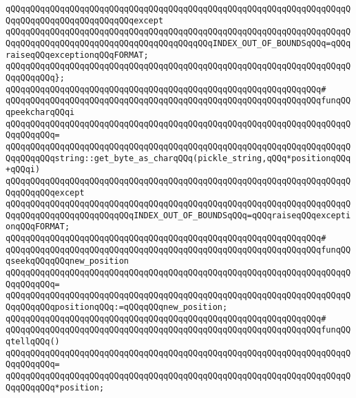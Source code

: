 \verb|qQQqqQQqqQQqqQQqqQQqqQQqqQQqqQQqqQQqqQQqqQQqqQQqqQQqqQQqqQQqqQQqqQQqqQQqqQQqqQQqqQQqqQQqqQQqqQQqexcept|\newline
\verb|qQQqqQQqqQQqqQQqqQQqqQQqqQQqqQQqqQQqqQQqqQQqqQQqqQQqqQQqqQQqqQQqqQQqqQQqqQQqqQQqqQQqqQQqqQQqqQQqqQQqqQQqqQQqqQQqINDEX_OUT_OF_BOUNDSqQQq=qQQqraiseqQQqexceptionqQQqFORMAT;|\newline
\verb|qQQqqQQqqQQqqQQqqQQqqQQqqQQqqQQqqQQqqQQqqQQqqQQqqQQqqQQqqQQqqQQqqQQqqQQqqQQqqQQq};|\newline
\verb|qQQqqQQqqQQqqQQqqQQqqQQqqQQqqQQqqQQqqQQqqQQqqQQqqQQqqQQqqQQqqQQq#|\newline
\verb|qQQqqQQqqQQqqQQqqQQqqQQqqQQqqQQqqQQqqQQqqQQqqQQqqQQqqQQqqQQqqQQqfunqQQqpeekcharqQQqi|\newline
\verb|qQQqqQQqqQQqqQQqqQQqqQQqqQQqqQQqqQQqqQQqqQQqqQQqqQQqqQQqqQQqqQQqqQQqqQQqqQQqqQQq=|\newline
\verb|qQQqqQQqqQQqqQQqqQQqqQQqqQQqqQQqqQQqqQQqqQQqqQQqqQQqqQQqqQQqqQQqqQQqqQQqqQQqqQQqstring::get_byte_as_charqQQq(pickle_string,qQQq*positionqQQq+qQQqi)|\newline
\verb|qQQqqQQqqQQqqQQqqQQqqQQqqQQqqQQqqQQqqQQqqQQqqQQqqQQqqQQqqQQqqQQqqQQqqQQqqQQqqQQqexcept|\newline
\verb|qQQqqQQqqQQqqQQqqQQqqQQqqQQqqQQqqQQqqQQqqQQqqQQqqQQqqQQqqQQqqQQqqQQqqQQqqQQqqQQqqQQqqQQqqQQqqQQqINDEX_OUT_OF_BOUNDSqQQq=qQQqraiseqQQqexceptionqQQqFORMAT;|\newline
\newline
\newline
\verb|qQQqqQQqqQQqqQQqqQQqqQQqqQQqqQQqqQQqqQQqqQQqqQQqqQQqqQQqqQQqqQQq#|\newline
\verb|qQQqqQQqqQQqqQQqqQQqqQQqqQQqqQQqqQQqqQQqqQQqqQQqqQQqqQQqqQQqqQQqfunqQQqseekqQQqqQQqnew_position|\newline
\verb|qQQqqQQqqQQqqQQqqQQqqQQqqQQqqQQqqQQqqQQqqQQqqQQqqQQqqQQqqQQqqQQqqQQqqQQqqQQqqQQq=|\newline
\verb|qQQqqQQqqQQqqQQqqQQqqQQqqQQqqQQqqQQqqQQqqQQqqQQqqQQqqQQqqQQqqQQqqQQqqQQqqQQqqQQqpositionqQQq:=qQQqqQQqnew_position;|\newline
\newline
\verb|qQQqqQQqqQQqqQQqqQQqqQQqqQQqqQQqqQQqqQQqqQQqqQQqqQQqqQQqqQQqqQQq#|\newline
\verb|qQQqqQQqqQQqqQQqqQQqqQQqqQQqqQQqqQQqqQQqqQQqqQQqqQQqqQQqqQQqqQQqfunqQQqtellqQQq()|\newline
\verb|qQQqqQQqqQQqqQQqqQQqqQQqqQQqqQQqqQQqqQQqqQQqqQQqqQQqqQQqqQQqqQQqqQQqqQQqqQQqqQQq=|\newline
\verb|qQQqqQQqqQQqqQQqqQQqqQQqqQQqqQQqqQQqqQQqqQQqqQQqqQQqqQQqqQQqqQQqqQQqqQQqqQQqqQQq*position;|\newline
